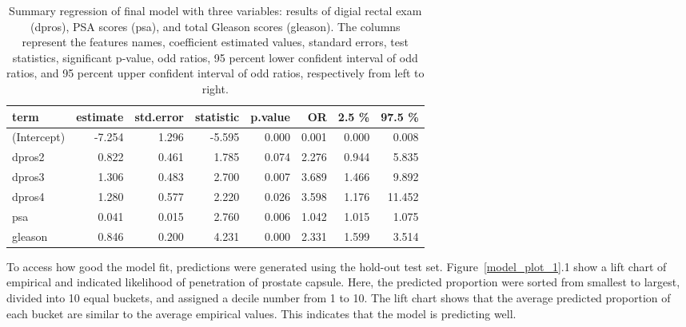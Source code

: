 \documentclass[11pt]{article}\usepackage[]{graphicx}\usepackage[]{color}
\begin{document}
\begin{center}
\begin{table}[ht]
\centering
\begin{tabular}{lrrrrrrr}
  \hline
term & estimate & std.error & statistic & p.value & OR & 2.5 \% & 97.5 \% \\ 
  \hline
(Intercept) & -7.254 & 1.296 & -5.595 & 0.000 & 0.001 & 0.000 & 0.008 \\ 
  dpros2 & 0.822 & 0.461 & 1.785 & 0.074 & 2.276 & 0.944 & 5.835 \\ 
  dpros3 & 1.306 & 0.483 & 2.700 & 0.007 & 3.689 & 1.466 & 9.892 \\ 
  dpros4 & 1.280 & 0.577 & 2.220 & 0.026 & 3.598 & 1.176 & 11.452 \\ 
  psa & 0.041 & 0.015 & 2.760 & 0.006 & 1.042 & 1.015 & 1.075 \\ 
  gleason & 0.846 & 0.200 & 4.231 & 0.000 & 2.331 & 1.599 & 3.514 \\ 
   \hline
\end{tabular}
\caption{Summary regression of final model with three variables: results of digial rectal exam (dpros), PSA scores (psa), and total Gleason scores (gleason). The columns represent the features names, coefficient estimated values, standard errors, test statistics, significant p-value, odd ratios, 95 percent lower confident interval of odd ratios, and 95 percent upper confident interval of odd ratios, respectively from left to right.} 
\label{reg_summary_final}
\end{table}

\end{center}

\noindent To access how good the model fit, predictions were generated using the hold-out test set. Figure~\ref{model_plot_1}.1 show a lift chart of empirical and indicated likelihood of penetration of prostate capsule. Here, the predicted proportion were sorted from smallest to largest, divided into 10 equal buckets, and assigned a decile number from 1 to 10. The lift chart shows that the average predicted proportion of each bucket are similar to the average empirical values. This indicates that the model is predicting well.  
\end{document}
